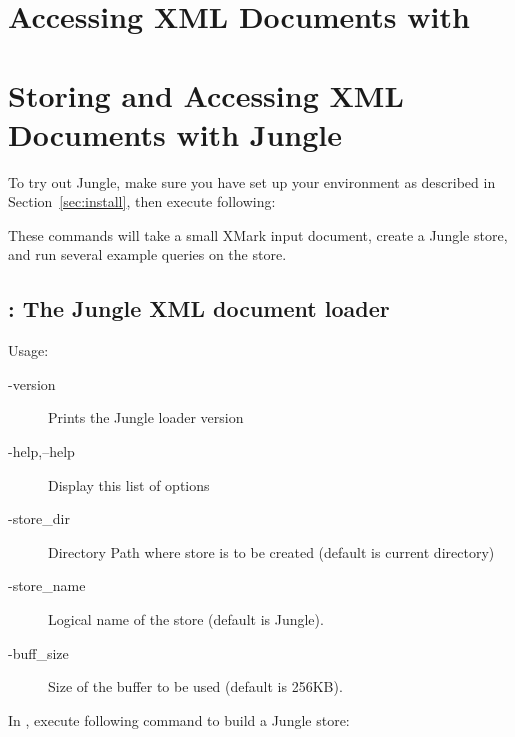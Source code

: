 \section{Accessing XML Documents with }

\section{Storing and Accessing XML Documents with Jungle}
\label{sec:jungle}


To try out Jungle, make sure you have set up your environment as
described in Section~\ref{sec:install}, then execute following: 
\begin{alltt}
% cd \$(GALAXHOME)/examples/jungle
% make tests
\end{alltt}


These commands will take a small XMark input document, create a Jungle
store, and run several example queries on the store. 

\subsection{ : The Jungle XML document loader}

Usage: 

\begin{description}
\item[-version]  Prints the Jungle loader version
\item[-help,--help]   Display this list of options
\end{description}

\begin{description}
\item[-store\_dir]  Directory Path where store is to be created  (default is current directory)
\item[-store\_name]  Logical name of the store (default is Jungle). 
\item[-buff\_size]  Size of the buffer to be used (default is 256KB).
\end{description}

In , execute following command to
build a Jungle store: 

